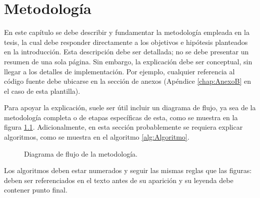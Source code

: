 \chapter{Metodología}\label{chap:metodologia}

En este capítulo se debe describir y fundamentar la metodología empleada en la tesis, la cual debe responder directamente a los objetivos e hipótesis planteados en la introducción. Esta descripción debe ser detallada; no se debe presentar un resumen de una sola página. Sin embargo, la explicación debe ser conceptual, sin llegar a los detalles de implementación. Por ejemplo, cualquier referencia al código fuente debe ubicarse en la sección de anexos (Apéndice \ref{chap:AnexoB} en el caso de esta plantilla).

Para apoyar la explicación, suele ser útil incluir un diagrama de flujo, ya sea de la metodología completa o de etapas específicas de esta, como se muestra en la figura \ref{img:Diagrama}. Adicionalmente, en esta sección probablemente se requiera explicar algoritmos, como se muestra en el algoritmo \ref{alg:Algoritmo}.

\begin{figure}[h]
    \centering
    \shorthandoff{>}
    \scalebox{0.7}{}
    \shorthandon{>}
    \caption{Diagrama de flujo de la metodología.}
    \label{img:Diagrama}
\end{figure}

\begin{algorithm}[h]
\caption{Nombre del algoritmo.}
\label{alg:Algoritmo}

\;
\end{algorithm}

Los algoritmos deben estar numerados y seguir las mismas reglas que las figuras: deben ser referenciados en el texto antes de su aparición y su leyenda debe contener punto final.